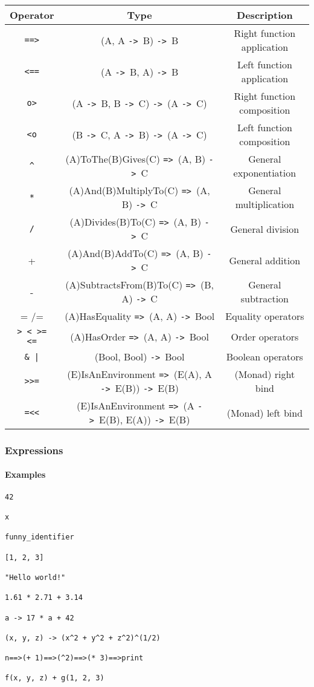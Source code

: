 \documentclass{article}
\def\ra{\texttt{->}\ }
\def\Ra{\texttt{=>}\ }
\begin{document}
\begin{tabular}{ |c|c|c| } 
\hline
Operator & Type & Description \\ 
\hline
\hline
\texttt{==>} & (A, A \ra B) \ra B & Right function application \\
\hline
\texttt{<==} & (A \ra B, A) \ra B & Left function application \\
\hline
\texttt{o>} & (A \ra B, B \ra C) \ra (A \ra C) & Right function composition \\
\hline
\texttt{<o} & (B \ra C, A \ra B) \ra (A \ra C) & Left function composition  \\
\hline
\texttt{\^} & (A)ToThe(B)Gives(C) \Ra (A, B) \ra C & General exponentiation \\
\hline
\texttt{*} & (A)And(B)MultiplyTo(C) \Ra (A, B) \ra C & General multiplication \\
\hline
\texttt{/} & (A)Divides(B)To(C) \Ra (A, B) \ra C & General division \\
\hline
+ & (A)And(B)AddTo(C) \Ra (A, B) \ra C & General addition \\ 
\hline
- & (A)SubtractsFrom(B)To(C) \Ra (B, A) \ra C & General subtraction \\
\hline
= /= & (A)HasEquality \Ra (A, A) \ra Bool & Equality operators \\
\hline
\texttt{> < >= <=} & (A)HasOrder \Ra (A, A) \ra Bool & Order operators \\
\hline
\texttt{\& |} & (Bool, Bool) \ra Bool & Boolean operators \\
\hline
\texttt{>>=} & (E)IsAnEnvironment \Ra (E(A), A \ra E(B)) \ra E(B) &
(Monad) right bind \\
\hline
\texttt{=<<} & (E)IsAnEnvironment \Ra (A \ra E(B), E(A)) \ra E(B) &
(Monad) left bind \\
\hline
\end{tabular}

\subsubsection{Expressions}

\paragraph{Examples}

\begin{verbatim}
42

x

funny_identifier 

[1, 2, 3]

"Hello world!"

1.61 * 2.71 + 3.14

a -> 17 * a + 42

(x, y, z) -> (x^2 + y^2 + z^2)^(1/2)

n==>(+ 1)==>(^2)==>(* 3)==>print

f(x, y, z) + g(1, 2, 3)
\end{verbatim}
\end{document}
